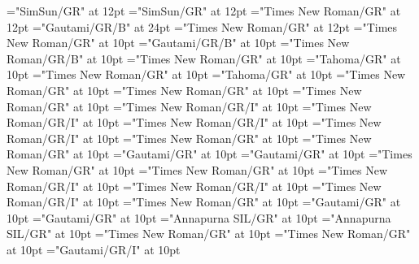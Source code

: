 \documentclass[a4paper]{article}
\begin{document}
\font\divzhCN="SimSun/GR" at 12pt
\font\spanzhCN="SimSun/GR" at 12pt
\font{}="Times New Roman/GR" at 12pt
\font{}="Gautami/GR/B" at 24pt
\font{}="Times New Roman/GR" at 12pt
\font\entryletData="Times New Roman/GR" at 10pt
\font\headwordggoTeluINentryletData="Gautami/GR/B" at 10pt
\font\spanenheadwordggoTeluINentryletData="Times New Roman/GR/B" at 10pt
\font\pronunciationsentryletData="Times New Roman/GR" at 10pt
\font\pronunciationggofonipaxemicpronunciationsentryletData="Tahoma/GR" at 10pt
\font\spanenpronunciationggofonipaxemicpronunciationsentryletData="Times New Roman/GR" at 10pt
\font\spanggofonipaxemicpronunciationggofonipaxemicpronunciationsentryletData="Tahoma/GR" at 10pt
\font\spanenpronunciationsentryletData="Times New Roman/GR" at 10pt
\font\sensesentryletData="Times New Roman/GR" at 10pt
\font\sensesensesentryletData="Times New Roman/GR" at 10pt
\font\grammaticalinfosensesensesentryletData="Times New Roman/GR/I" at 10pt
\font\partofspeechengrammaticalinfosensesensesentryletData="Times New Roman/GR/I" at 10pt
\font\spanenpartofspeechengrammaticalinfosensesensesentryletData="Times New Roman/GR/I" at 10pt
\font\spanengrammaticalinfosensesensesentryletData="Times New Roman/GR/I" at 10pt
\font{}="Times New Roman/GR" at 10pt
\font\spanendefinitionensensesensesentryletData="Times New Roman/GR" at 10pt
\font\LexSensepublishStemGlossPubLdtesensesensesentryletData="Gautami/GR" at 10pt
\font\spanteLexSensepublishStemGlossPubLdtesensesensesentryletData="Gautami/GR" at 10pt
\font\spanenLexSensepublishStemGlossPubLdtesensesensesentryletData="Times New Roman/GR" at 10pt
\font\spanensensesentryletData="Times New Roman/GR" at 10pt
\font\grammaticalinfoentryletData="Times New Roman/GR/I" at 10pt
\font\partofspeechengrammaticalinfoentryletData="Times New Roman/GR/I" at 10pt
\font\spanenpartofspeechengrammaticalinfoentryletData="Times New Roman/GR/I" at 10pt
\font\xsensenumbersensesensesentryletData="Times New Roman/GR" at 10pt
\font\xitemteLexSensepublishStemGlossPubLdtesensesensesentryletData="Gautami/GR" at 10pt
\font\spantexitemteLexSensepublishStemGlossPubLdtesensesensesentryletData="Gautami/GR" at 10pt
\font\xitemhiLexSensepublishStemGlossPubLdtesensesensesentryletData="Annapurna SIL/GR" at 10pt
\font\spanhixitemhiLexSensepublishStemGlossPubLdtesensesensesentryletData="Annapurna SIL/GR" at 10pt
\font\examplessensesensesentryletData="Times New Roman/GR" at 10pt
\font\xitemexamplessensesensesentryletData="Times New Roman/GR" at 10pt
\font\exampleggoTeluINxitemexamplessensesensesentryletData="Gautami/GR/I" at 10pt
\end{document}
